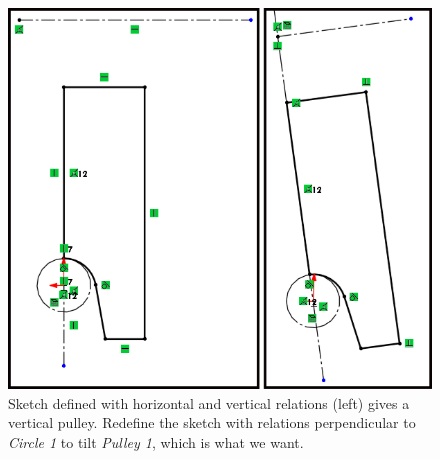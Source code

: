 \begin{figure}[H]
\begin{center}
\includegraphics{images/figures/tilt-pulley-relations.png}
\end{center}
\caption{Sketch defined with horizontal and vertical relations (left) gives a vertical
  pulley. Redefine the sketch with relations perpendicular to \emph{Circle 1} to tilt
  \emph{Pulley 1}, which is what we want.
\label{fig:tilt-pulley-relations}}

\end{figure}

\pagebreak

